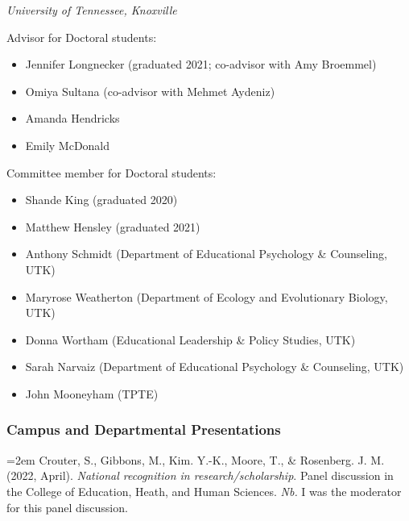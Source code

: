 \documentclass[
  14,
]{article}
\providecommand{\tightlist}{%
  \setlength{\itemsep}{0pt}\setlength{\parskip}{0pt}}
\begin{document}
\emph{University of Tennessee, Knoxville}

Advisor for Doctoral students:

\begin{itemize}
\tightlist
\item
  Jennifer Longnecker (graduated 2021; co-advisor with Amy Broemmel)\\
\item
  Omiya Sultana (co-advisor with Mehmet Aydeniz)\\
\item
  Amanda Hendricks\\
\item
  Emily McDonald
\end{itemize}

Committee member for Doctoral students:

\begin{itemize}
\tightlist
\item
  Shande King (graduated 2020)\\
\item
  Matthew Hensley (graduated 2021)\\
\item
  Anthony Schmidt (Department of Educational Psychology \& Counseling,
  UTK)\\
\item
  Maryrose Weatherton (Department of Ecology and Evolutionary Biology,
  UTK)\\
\item
  Donna Wortham (Educational Leadership \& Policy Studies, UTK)\\
\item
  Sarah Narvaiz (Department of Educational Psychology \& Counseling,
  UTK)\\
\item
  John Mooneyham (TPTE)
\end{itemize}

\hypertarget{campus-and-departmental-presentations}{%
\subsubsection{Campus and Departmental
Presentations}\label{campus-and-departmental-presentations}}

\hangindent=2em Crouter, S., Gibbons, M., Kim. Y.-K., Moore, T., \&
Rosenberg. J. M. (2022, April). \emph{National recognition in
research/scholarship}. Panel discussion in the College of Education,
Heath, and Human Sciences. \emph{Nb.} I was the moderator for this panel
discussion.
\end{document}
